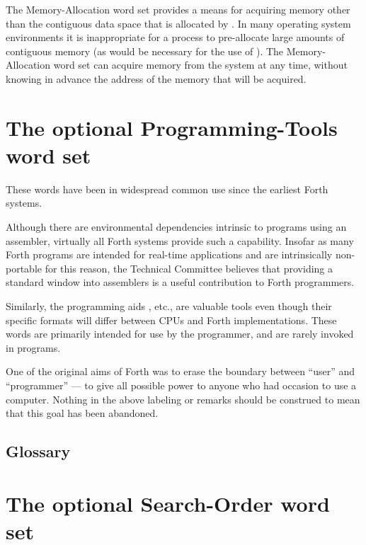 The Memory-Allocation word set provides a means for acquiring memory
other than the contiguous data space that is allocated by .
In many operating system environments it is inappropriate for a process
to pre-allocate large amounts of contiguous memory (as would be
necessary for the use of ).  The Memory-Allocation word set
can acquire memory from the system at any time, without knowing in
advance the address of the memory that will be acquired.


\section{The optional Programming-Tools word set} %
\label{rat:tools}

These words have been in widespread common use since the earliest
Forth systems.

Although there are environmental dependencies intrinsic to programs
using an assembler, virtually all Forth systems provide such a
capability. Insofar as many Forth programs are intended for real-time
applications and are intrinsically non-portable for this reason, the
Technical Committee believes that providing a standard window into
assemblers is a useful contribution to Forth programmers.

Similarly, the programming aids , etc., are valuable tools
even though their specific formats will differ between CPUs and Forth
implementations. These words are primarily intended for use by the
programmer, and are rarely invoked in programs.

One of the original aims of Forth was to erase the boundary between
``user'' and ``programmer'' --- to give all possible power to anyone
who had occasion to use a computer. Nothing in the above labeling or
remarks should be construed to mean that this goal has been abandoned.

\setcounter{subsection}{5}
\subsection{Glossary} %



\section{The optional Search-Order word set} %
\label{rat:search}

